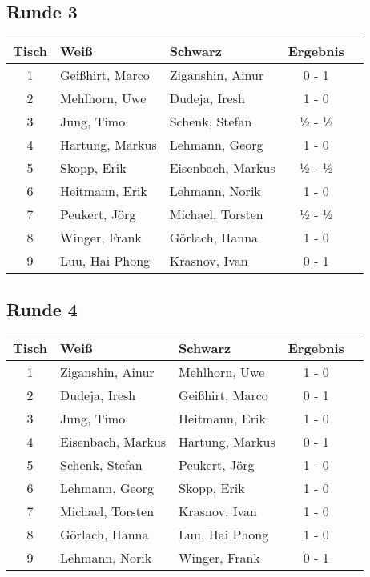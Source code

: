 \documentclass[a4paper,ngerman]{tui-algo-seminar}
\begin{document}
\subsection{Runde 3}
\begin{center}
\begin{tabular}{cllcl}
\toprule
\textbf{Tisch} & \textbf{Weiß} & \textbf{Schwarz} & \textbf{Ergebnis} \\
\midrule
1 & Geißhirt, Marco & Ziganshin, Ainur & 0 - 1 \\
2 & Mehlhorn, Uwe & Dudeja, Iresh & 1 - 0 \\
3 & Jung, Timo & Schenk, Stefan & ½ - ½ \\
4 & Hartung, Markus & Lehmann, Georg & 1 - 0 \\
5 & Skopp, Erik & Eisenbach, Markus & ½ - ½ \\
6 & Heitmann, Erik & Lehmann, Norik & 1 - 0 \\
7 & Peukert, Jörg & Michael, Torsten & ½ - ½ \\
8 & Winger, Frank & Görlach, Hanna & 1 - 0 \\
9 & Luu, Hai Phong & Krasnov, Ivan & 0 - 1 \\
\bottomrule
\end{tabular}
\end{center}

\subsection{Runde 4}
\begin{center}
\begin{tabular}{cllcl}
\toprule
\textbf{Tisch} & \textbf{Weiß} & \textbf{Schwarz} & \textbf{Ergebnis} \\
\midrule
1 & Ziganshin, Ainur & Mehlhorn, Uwe & 1 - 0 \\
2 & Dudeja, Iresh & Geißhirt, Marco & 0 - 1 \\
3 & Jung, Timo & Heitmann, Erik & 1 - 0 \\
4 & Eisenbach, Markus & Hartung, Markus & 0 - 1 \\
5 & Schenk, Stefan & Peukert, Jörg & 1 - 0 \\
6 & Lehmann, Georg & Skopp, Erik & 1 - 0 \\
7 & Michael, Torsten & Krasnov, Ivan & 1 - 0 \\
8 & Görlach, Hanna & Luu, Hai Phong & 1 - 0 \\
9 & Lehmann, Norik & Winger, Frank & 0 - 1 \\
\bottomrule
\end{tabular}
\end{center}
\end{document}
